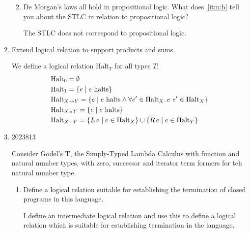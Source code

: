 \documentclass[10pt,\jkfside,a4paper]{article}
\begin{document}
\begin{enumerate}
\begin{enumerate}
\begin{enumerate}
        \end{enumerate}

        \label{itm:b}

        \item De Morgan's laws all hold in propositional logic. What does~\ref{itm:b} tell you about the STLC in relation to propositional logic?

        The STLC does not correspond to propositional logic.

    \end{enumerate}

    \item Extend logical relation to support products and sums.

    We define a logical relation $\mathrm{Halt}_T$ for all types $T$:
    \begin{align*}
        & \mathrm{Halt}_0 = \emptyset \\
        & \mathrm{Halt}_1 = \{e \mid e\ \mathrm{halts}\} \\
        & \mathrm{Halt}_{X \to Y} = \{e \mid e\ \mathrm{halts} \land \forall e' \in \mathrm{Halt}_X\ldotp e\ e' \in \mathrm{Halt}_X\} \\
        & \mathrm{Halt}_{X \times Y} = \{e \mid e\ \mathrm{halts}\} \\
        & \mathrm{Halt}_{X + Y} = \{L\, e \mid e \in \mathrm{Halt}_X\} \cup \{R\, e \mid e \in \mathrm{Halt}_Y\}
    \end{align*}

    \item

    \begin{examquestion}{2023}{8}{13}

        Consider G\"odel's T, the Simply-Typed Lambda Calculus with function and natural number types, with zero, successor and iterator term formers for teh natural number type.

        \begin{enumerate}[label=$(\alph*)$]

            \item Define a logical relation suitable for establishing the termination of closed programs in this language.

            I define an intermediate logical relation and use this to define a logical relation which is suitable for establishing termination in the language.


\end{enumerate}
\end{examquestion}
\end{enumerate}
\end{document}
